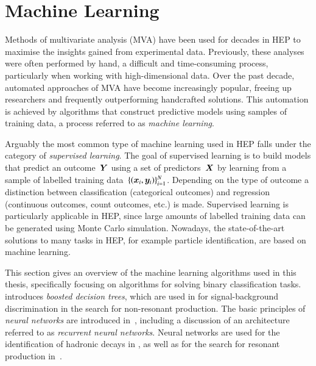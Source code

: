 \section{Machine Learning}%
\label{sec:machine_learning}

Methods of multivariate analysis (MVA) have been used for decades in HEP to
maximise the insights gained from experimental data. Previously, these analyses
were often performed by hand, a difficult and time-consuming process,
particularly when working with high-dimensional data. Over the past decade,
automated approaches of MVA have become increasingly popular, freeing up
researchers and frequently outperforming handcrafted solutions. This automation
is achieved by algorithms that construct predictive models using samples of
training data, a process referred to as \emph{machine learning}.

Arguably the most common type of machine learning used in HEP falls under the
category of \emph{supervised learning}. The goal of supervised learning is to
build models that predict an outcome~$\bm{Y}$ using a set of
predictors~$\bm{X}$ by learning from a sample of labelled training
data~$\{ (\bm{x}_i, \bm{y}_i) \}_{i=1}^{N}$. Depending on the type of
outcome a distinction between classification (categorical outcomes) and
regression (continuous outcomes, count outcomes, etc.) is made. Supervised
learning is particularly applicable in HEP, since large amounts of labelled
training data can be generated using Monte Carlo simulation.
Nowadays, the state-of-the-art solutions to many tasks in HEP, for example
particle identification, are based on machine learning.

This section gives an overview of the machine learning algorithms used in this
thesis, specifically focusing on algorithms for solving binary classification
tasks.  introduces \emph{boosted decision trees}, which are used
in  for signal-background
discrimination in the search for non-resonant \HH production. The basic
principles of \emph{neural networks} are introduced
in~, including a discussion of an architecture
referred to as \emph{recurrent neural networks}. Neural networks are used for
the identification of hadronic \taulepton decays in , as well as
for the search for resonant \HH production in~.


